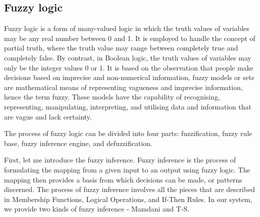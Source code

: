 \documentclass[journal,a4paper,onecolumn]{article}
\newcommand{\comR}[1]{\textcolor{red}{\emph{#1}}}
\begin{document}
\subsection{Fuzzy logic}
Fuzzy logic is a form of many-valued logic in which the truth values of variables may be any real number between 0 and 1. It is employed to handle the concept of partial truth, where the truth value may range between completely true and completely false. By contrast, in Boolean logic, the truth values of variables may only be the integer values 0 or 1. It is based on the observation that people make decisions based on imprecise and non-numerical information, fuzzy models or sets are mathematical means of representing vagueness and imprecise information, hence the term fuzzy. These models have the capability of recognising, representing, manipulating, interpreting, and utilising data and information that are vague and lack certainty. \cite{fuzzylogic}

The process of fuzzy logic can be divided into four parts: fuzzification, fuzzy rule base, fuzzy inference engine, and defuzzification.



First, let me introduce the fuzzy inference. Fuzzy inference is the process of formulating the mapping from a given input to an output using fuzzy logic. The mapping then provides a basis from which decisions can be made, or patterns discerned. The process of fuzzy inference involves all the pieces that are described in Membership Functions, Logical Operations, and If-Then Rules. \cite{fip} In our system, we provide two kinds of fuzzy inference - Mamdani and T-S.
\end{document}
